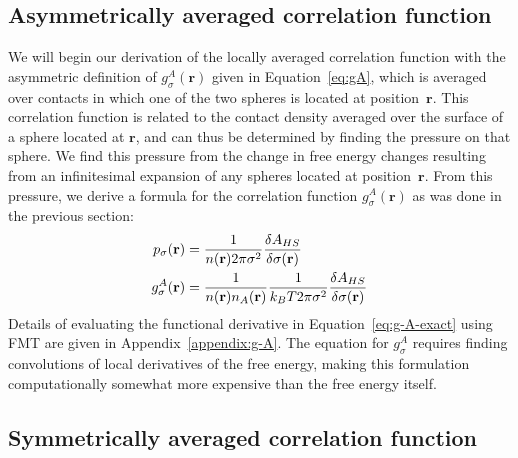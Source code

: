 \documentclass[letterpaper,twocolumn,amsmath,amssymb,jcp,10pt,aip]{revtex4-1}
\newcommand{\rr}{\textbf{r}}
\newcommand{\derivation}[1]{} %
\begin{document}
\subsection{Asymmetrically averaged correlation function}\label{sec:g-A}

We will begin our derivation of the locally averaged correlation
function with the asymmetric definition of $g_\sigma^A(\rr)$ given in
Equation~\ref{eq:gA}, which is averaged over contacts in which one of
the two spheres is located at position~$\rr$.  This correlation
function is related to the contact density averaged over the surface
of a sphere located at $\rr$, and can thus be determined by finding
the pressure on that sphere.  We find this pressure from the change in
free energy changes resulting from an infinitesimal expansion of any
spheres located at position~$\rr$.  From this pressure, we derive a
formula for the correlation function $g_\sigma^A(\rr)$ as was done in
the previous section:
\begin{align}
  p_\sigma(\mathbf{r}) &= \frac{1}{n(\rr) 2\pi \sigma^2} \frac{\delta
    A_{HS}}{\delta \sigma(\mathbf{r})} \label{eq:p_{HS}^A}\\
  g_\sigma^A(\rr)%
  &= \frac{1}{n(\rr) n_A(\rr)}\frac{1}{ k_BT 2\pi \sigma^2} \frac{\delta
    A_{HS}}{\delta \sigma(\mathbf{r})} \label{eq:g-A-exact}
\end{align}
Details of evaluating the functional derivative in
Equation~\ref{eq:g-A-exact} using FMT are given in
Appendix~\ref{appendix:g-A}.  The equation for $g_\sigma^A$ requires
finding convolutions of local derivatives of the free energy, making
this formulation computationally somewhat more expensive than the free
energy itself.

\derivation{
  \end{widetext}
}

\subsection{Symmetrically averaged correlation function}\label{sec:g-S}
\end{document}
